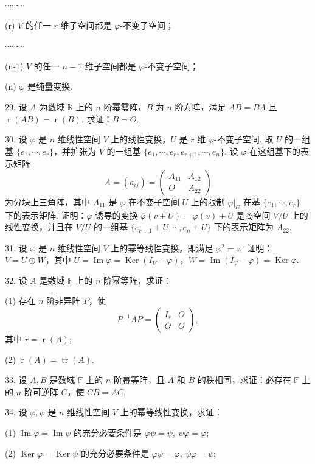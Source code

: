 \documentclass[UTF8, 12pt, fontset=fandol, oneside]{ctexart}
\begin{document}
$\cdots\cdots\cdots$

(r) $V$ 的任一 $r$ 维子空间都是 $\varphi$-不变子空间；

$\cdots\cdots\cdots$

(n-1) $V$ 的任一 $n-1$ 维子空间都是 $\varphi$-不变子空间；

(n) $\varphi$ 是纯量变换.

29. 设 $A$ 为数域 $\mathbb{K}$ 上的 $n$ 阶幂零阵，$B$ 为 $n$ 阶方阵，满足 $AB=BA$ 且 $\operatorname{r}(AB)=\operatorname{r}(B)$. 求证：$B=O$.

30. 设 $\varphi$ 是 $n$ 维线性空间 $V$ 上的线性变换，$U$ 是 $r$ 维 $\varphi$-不变子空间. 取 $U$ 的一组基 $\{e_1,\cdots,e_r\}$，并扩张为 $V$ 的一组基 $\{e_1,\cdots,e_r,e_{r+1},\cdots,e_n\}$. 设 $\varphi$ 在这组基下的表示矩阵
\[
A=(a_{ij})=
\left(\begin{array}{cc}
A_{11} & A_{12}\\
O & A_{22}
\end{array}\right)
\]
为分块上三角阵，其中 $A_{11}$ 是 $\varphi$ 在不变子空间 $U$ 上的限制 $\varphi|_U$ 在基 $\{e_1,\cdots,e_r\}$ 下的表示矩阵. 证明：$\varphi$ 诱导的变换 $\overline{\varphi}(v+U)=\varphi(v)+U$ 是商空间 $V/U$ 上的线性变换，并且在 $V/U$ 的一组基 $\{e_{r+1}+U,\cdots,e_n+U\}$ 下的表示矩阵为 $A_{22}$.

31. 设 $\varphi$ 是 $n$ 维线性空间 $V$ 上的幂等线性变换，即满足 $\varphi^2=\varphi$. 证明：$V=U\oplus W$，其中 $U=\operatorname{Im}\varphi=\operatorname{Ker}(I_V-\varphi)$，$W=\operatorname{Im}(I_V-\varphi)=\operatorname{Ker}\varphi$.

32. 设 $A$ 是数域 $\mathbb{F}$ 上的 $n$ 阶幂等阵，求证：

(1) 存在 $n$ 阶非异阵 $P$，使
\[
P^{-1}AP=
\left(\begin{array}{cc}
I_r & O\\
O & O
\end{array}\right),
\]
其中 $r=\operatorname{r}(A)$;

(2) $\operatorname{r}(A)=\operatorname{tr}(A)$.

33. 设 $A,B$ 是数域 $\mathbb{F}$ 上的 $n$ 阶幂等阵，且 $A$ 和 $B$ 的秩相同，求证：必存在 $\mathbb{F}$ 上的 $n$ 阶可逆阵 $C$，使 $CB=AC$.

34. 设 $\varphi,\psi$ 是 $n$ 维线性空间 $V$ 上的幂等线性变换，求证：

(1) $\operatorname{Im}\varphi=\operatorname{Im}\psi$ 的充分必要条件是 $\varphi\psi=\psi,\ \psi\varphi=\varphi$;

(2) $\operatorname{Ker}\varphi=\operatorname{Ker}\psi$ 的充分必要条件是 $\varphi\psi=\varphi,\ \psi\varphi=\psi$;
\end{document}
